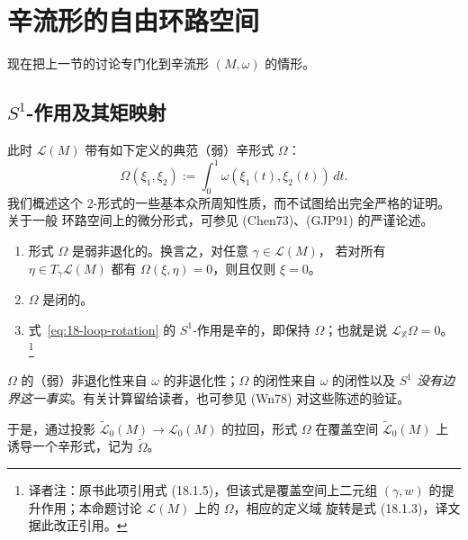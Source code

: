 \section{辛流形的自由环路空间}
\label{sec:free-loop-space-symplectic-manifold}

现在把上一节的讨论专门化到辛流形 $(M,\omega)$ 的情形。

\subsection{\texorpdfstring{$S^1$-作用及其矩映射}{S¹-作用及其矩映射}}
\label{subsec:circle-action-moment-map}

此时 $\mathcal L(M)$ 带有如下定义的典范（弱）辛形式 $\Omega$：
\begin{equation}
 \Omega(\xi_1,\xi_2):=\int_0^1\omega(\xi_1(t),\xi_2(t))\,dt.
 \label{eq:18-loop-space-symplectic-form}
\end{equation}
我们概述这个 2-形式的一些基本众所周知性质，而不试图给出完全严格的证明。关于一般
环路空间上的微分形式，可参见 (Chen73)、(GJP91) 的严谨论述。

\begin{proposition}
\label{prop:18-loop-space-symplectic-properties}
\begin{enumerate}[label=(\arabic*)]
\item 形式 $\Omega$ 是弱非退化的。换言之，对任意 $\gamma\in\mathcal L(M)$，
若对所有 $\eta\in T_\gamma\mathcal L(M)$ 都有 $\Omega(\xi,\eta)=0$，则且仅则
$\xi=0$。
\item $\Omega$ 是闭的。
\item 式~\eqref{eq:18-loop-rotation} 的 $S^1$-作用是辛的，即保持
$\Omega$；也就是说 $\mathcal L_{\mathbb X}\Omega=0$。
\footnote{译者注：原书此项引用式 (18.1.5)，但该式是覆盖空间上二元组
$(\gamma,w)$ 的提升作用；本命题讨论 $\mathcal L(M)$ 上的 $\Omega$，相应的定义域
旋转是式 (18.1.3)，译文据此改正引用。}
\end{enumerate}
\end{proposition}

$\Omega$ 的（弱）非退化性来自 $\omega$ 的非退化性；$\Omega$ 的闭性来自
$\omega$ 的闭性以及 \emph{$S^1$ 没有边界这一事实}。有关计算留给读者，也可参见 (Wn78)
对这些陈述的验证。

于是，通过投影 $\widetilde{\mathcal L}_0(M)\to\mathcal L_0(M)$ 的拉回，形式
$\Omega$ 在覆盖空间 $\widetilde{\mathcal L}_0(M)$ 上诱导一个辛形式，记为
$\widetilde\Omega$。

